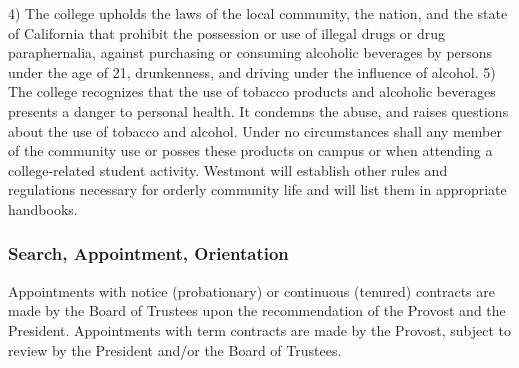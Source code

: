 \documentclass[letterpaper, 11pt]{article}
\begin{document}
\begin{enumerate}[label=\alph*)]
					4) The college upholds the laws of the local community, the nation, and the state of California that prohibit the possession or use of illegal drugs or drug paraphernalia, against purchasing or consuming alcoholic beverages by persons under the age of 21, drunkenness, and driving under the influence of alcohol.
					5) The college recognizes that the use of tobacco products and alcoholic beverages presents a danger to personal health.  It condemns the abuse, and raises questions about the use of tobacco and alcohol.  Under no circumstances shall any member of the community use or posses these products on campus or when attending a college-related student activity.
					Westmont will establish other rules and regulations necessary for orderly community life and will list them in appropriate handbooks.
				\end{enumerate}
		\subsubsection{Search, Appointment, Orientation}
			Appointments with notice (probationary) or continuous (tenured) contracts are made by the Board of Trustees upon the recommendation of the Provost and the President. Appointments with term contracts are made by the Provost, subject to review by the President and/or the Board of Trustees.
\end{document}
